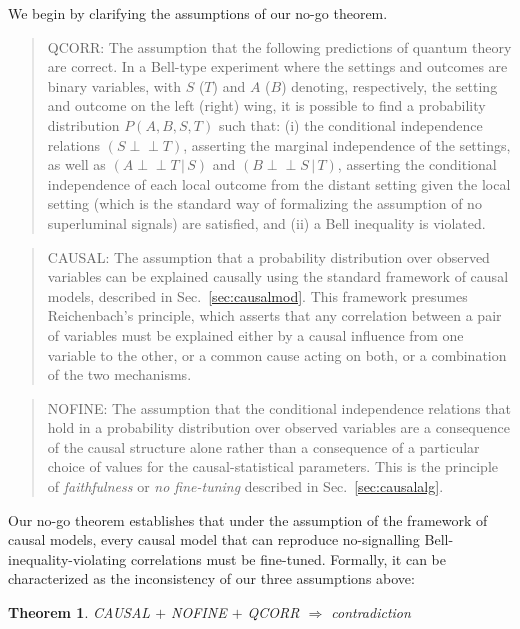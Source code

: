 \documentclass[12pt,onecolumn,nofootinbib]{revtex4-2}
\newtheorem{theorem}{Theorem}
\def\indep{\perp\!\!\!\!\perp}
\begin{document}
We begin by clarifying the assumptions of our  no-go theorem.

\begin{quote}
QCORR:  The assumption that the following predictions of quantum theory are correct.  In a Bell-type experiment where the settings and outcomes are binary variables, with $S$ ($T$) and $A$ ($B$) denoting, respectively, the setting and outcome on the left (right) wing, it is possible to find a probability distribution $P(A,B,S,T)$ such that: (i) the conditional independence relations $\left( S\indep T\right)$, asserting the marginal independence of the
settings, as well as $\left( A\indep T\,|\,S\right) $ and $\left( B\indep S\,|\,T\right) $, asserting the conditional independence of each local outcome from the distant setting given the local setting (which is the standard way of formalizing the assumption of no superluminal signals) are satisfied, and (ii) a Bell inequality is violated. 
\end{quote}


\begin{quote}
CAUSAL:  The assumption that a probability distribution over observed variables 
can be explained causally using the standard framework of causal models, described in Sec.~\ref{sec:causalmod}.  This framework presumes Reichenbach's principle, which asserts that any correlation between a pair of variables must be explained either by a causal influence from one variable to the other, or a common cause acting on both, or a combination of the two mechanisms.  
\end{quote}

\begin{quote}
NOFINE: The assumption that the conditional independence relations that hold in a probability distribution over observed variables 
are a consequence of the causal structure alone rather than a consequence of a particular choice of values for the causal-statistical parameters.  This is the principle of {\em faithfulness} or {\em no fine-tuning} described in Sec.~\ref{sec:causalalg}.
\end{quote}

Our no-go theorem establishes that under the assumption of the framework of causal models,
 every causal model that can reproduce no-signalling Bell-inequality-violating correlations must be fine-tuned.  Formally, it can be characterized as the inconsistency of our three assumptions above:

\begin{theorem}
CAUSAL $+$ NOFINE $+$ QCORR $\Rightarrow$ contradiction
\end{theorem}
\end{document}

